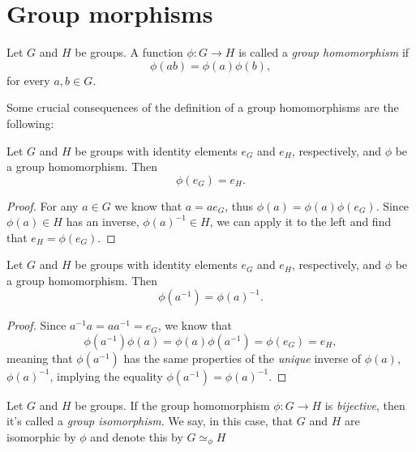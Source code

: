 \documentclass{___mymonograph}
\begin{document}
\section{Group morphisms}

\begin{definition}
Let \(G\) and \(H\) be groups. A function \(\phi:G\to H\) is called a \emph{group homomorphism} if
\begin{equation}
    \phi(ab)=\phi(a)\phi(b),
\end{equation}
for every \(a,b\in G\).
\end{definition}

Some crucial consequences of the definition of a group homomorphisms are the following:

\begin{proposition}
Let \(G\) and \(H\) be groups with identity elements \(e_G\) and \(e_H\), respectively, and \(\phi\) be a group homomorphism. Then
\begin{equation}
    \phi(e_G) = e_H.
\end{equation}
\end{proposition}
\begin{proof}
For any \(a\in G\) we know that \(a = ae_G\), thus \(\phi(a) = \phi(a)\phi(e_G)\). Since \(\phi(a)\in H\) has an inverse, \(\phi(a)^{-1}\in H\), we can apply it to the left and find that \(e_H = \phi(e_G)\).
\end{proof}

\begin{proposition}
Let \(G\) and \(H\) be groups with identity elements \(e_G\) and \(e_H\), respectively, and \(\phi\) be a group homomorphism. Then
\begin{equation}
    \phi(a^{-1}) = \phi(a)^{-1}.
\end{equation}
\end{proposition}
\begin{proof}
Since \(a^{-1}a = a a^{-1} = e_G\), we know that
\begin{equation}
    \phi(a^{-1})\phi(a) = \phi(a)\phi(a^{-1}) = \phi(e_G) = e_H,
\end{equation}
meaning that \(\phi(a^{-1})\) has the same properties of the \emph{unique} inverse of \(\phi(a)\), \(\phi(a)^{-1}\), implying the equality \(\phi(a^{-1}) = \phi(a)^{-1}\).
\end{proof}

\begin{definition}
Let \(G\) and \(H\) be groups. If the group homomorphism \(\phi:G\to H\) is \emph{bijective}, then it's called a \emph{group isomorphism}. We say, in this case, that \(G\) and \(H\) are isomorphic by \(\phi\) and denote this by \(G\simeq_{\phi}H\)
\end{definition}
\end{document}
